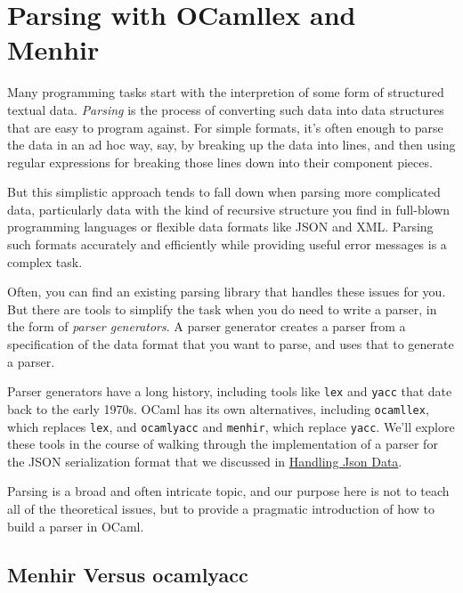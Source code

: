 \hypertarget{parsing-with-ocamllex-and-menhir}{%
\section{Parsing with OCamllex and
Menhir}\label{parsing-with-ocamllex-and-menhir}}

Many programming tasks start with the interpretion of some form of
structured textual data. \emph{Parsing} is the process of converting
such data into data structures that are easy to program against. For
simple formats, it's often enough to parse the data in an ad hoc way,
say, by breaking up the data into lines, and then using regular
expressions for breaking those lines down into their component pieces.

But this simplistic approach tends to fall down when parsing more
complicated data, particularly data with the kind of recursive structure
you find in full-blown programming languages or flexible data formats
like JSON and XML. Parsing such formats accurately and efficiently while
providing useful error messages is a complex task.

Often, you can find an existing parsing library that handles these
issues for you. But there are tools to simplify the task when you do
need to write a parser, in the form of \emph{parser generators}. A
parser generator creates a parser from a specification of the data
format that you want to parse, and uses that to generate a parser.

Parser generators have a long history, including tools like
\passthrough{\lstinline!lex!} and \passthrough{\lstinline!yacc!} that
date back to the early 1970s. OCaml has its own alternatives, including
\passthrough{\lstinline!ocamllex!}, which replaces
\passthrough{\lstinline!lex!}, and \passthrough{\lstinline!ocamlyacc!}
and \passthrough{\lstinline!menhir!}, which replace
\passthrough{\lstinline!yacc!}. We'll explore these tools in the course
of walking through the implementation of a parser for the JSON
serialization format that we discussed in
\href{json.html\#handling-json-data}{Handling Json Data}.

Parsing is a broad and often intricate topic, and our purpose here is
not to teach all of the theoretical issues, but to provide a pragmatic
introduction of how to build a parser in OCaml.

\hypertarget{menhir-versus-ocamlyacc}{%
\subsection{Menhir Versus ocamlyacc}\label{menhir-versus-ocamlyacc}}

